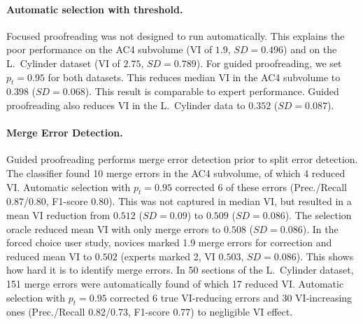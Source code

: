 \paragraph{Automatic selection with threshold.} Focused proofreading was not designed to run automatically. This explains the poor performance on the AC4 subvolume (VI of $1.9$, $SD=0.496$) and on the L.~Cylinder dataset (VI of $2.75$, $SD=0.789$). For guided proofreading, we set $p_t=0.95$ for both datasets. This reduces median VI in the AC4 subvolume to $0.398$ ($SD=0.068$). This result is comparable to expert performance. Guided proofreading also reduces VI in the L.~Cylinder data to $0.352$ ($SD=0.087$).

\paragraph{Merge Error Detection.} Guided proofreading performs merge error detection prior to split error detection. The classifier found 10 merge errors in the AC4 subvolume, of which 4 reduced VI. Automatic selection with $p_t=0.95$ corrected 6 of these errors (Prec./Recall 0.87/0.80, F1-score 0.80). This was not captured in median VI, but resulted in a mean VI reduction from $0.512$ ($SD=0.09$) to $0.509$ ($SD=0.086$). The selection oracle reduced mean VI with only merge errors to $0.508$ ($SD=0.086$). In the forced choice user study, novices marked 1.9 merge errors for correction and reduced mean VI to $0.502$ (experts marked 2, VI $0.503$, $SD=0.086$). This shows how hard it is to identify merge errors. In 50 sections of the L.~Cylinder dataset, 151 merge errors were automatically found of which 17 reduced VI. Automatic selection with $p_t=0.95$ corrected 6 true VI-reducing errors and 30 VI-increasing ones (Prec./Recall 0.82/0.73, F1-score 0.77) to negligible VI effect. 

